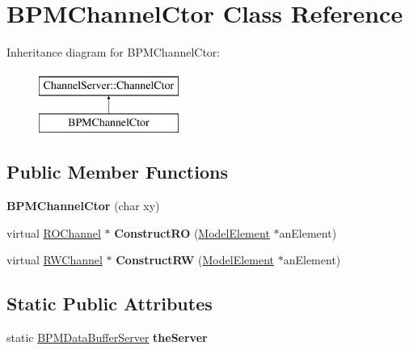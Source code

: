 \hypertarget{classBPMChannelCtor}{}\section{B\+P\+M\+Channel\+Ctor Class Reference}
\label{classBPMChannelCtor}
Inheritance diagram for B\+P\+M\+Channel\+Ctor\+:\begin{figure}[H]
\begin{center}
\leavevmode
\includegraphics[height=2.000000cm]{classBPMChannelCtor}
\end{center}
\end{figure}
\subsection*{Public Member Functions}
\begin{DoxyCompactItemize}
\item 
\mbox{\label{classBPMChannelCtor_a04a47491e8aaa4bbc6b737cacd72d1a3}} 
{\bfseries B\+P\+M\+Channel\+Ctor} (char xy)
\item 
\mbox{\label{classBPMChannelCtor_a6679bced189b1099cffcd04e624b0702}} 
virtual \hyperlink{classROChannel}{R\+O\+Channel} $\ast$ {\bfseries Construct\+RO} (\hyperlink{classModelElement}{Model\+Element} $\ast$an\+Element)
\item 
\mbox{\label{classBPMChannelCtor_ac25de30b6e0bee8cfd2152d9c03e8d4d}} 
virtual \hyperlink{classRWChannel}{R\+W\+Channel} $\ast$ {\bfseries Construct\+RW} (\hyperlink{classModelElement}{Model\+Element} $\ast$an\+Element)
\end{DoxyCompactItemize}
\subsection*{Static Public Attributes}
\begin{DoxyCompactItemize}
\item 
\mbox{\label{classBPMChannelCtor_a18f9bbeb19f981ae0c342efd0c4ad5bf}} 
static \hyperlink{classBPMDataBufferServer}{B\+P\+M\+Data\+Buffer\+Server} {\bfseries the\+Server}
\end{DoxyCompactItemize}
